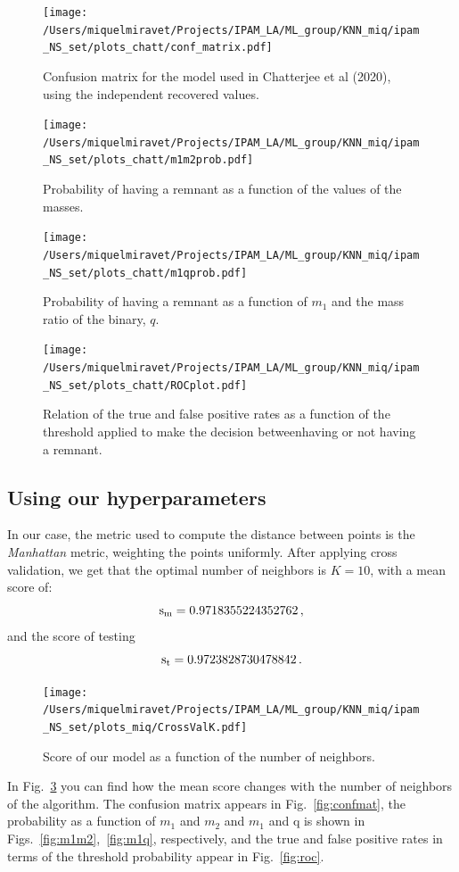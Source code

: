 \documentclass[prd,aps,twocolumn,a4paper,showkeys,nofootinbib]{revtex4-2}
\begin{document}
\begin{figure}[]
    \texttt{[image: /Users/miquelmiravet/Projects/IPAM\_LA/ML\_group/KNN\_miq/ipam\_NS\_set/plots\_chatt/conf\_matrix.pdf]}
    \caption{Confusion matrix for the model used in Chatterjee et al (2020), using the independent recovered values. }
    \label{fig:confmatChat}
    \texttt{[image: /Users/miquelmiravet/Projects/IPAM\_LA/ML\_group/KNN\_miq/ipam\_NS\_set/plots\_chatt/m1m2prob.pdf]}
    \caption{Probability of having a remnant as a function of the values of the masses.}
    \label{fig:m1m2Chat}
\end{figure}
\begin{figure}[]
    \texttt{[image: /Users/miquelmiravet/Projects/IPAM\_LA/ML\_group/KNN\_miq/ipam\_NS\_set/plots\_chatt/m1qprob.pdf]}
    \caption{Probability of having a remnant as a function of $m_1$ and the mass ratio of the binary, $q$.}
    \label{fig:m1qChat}
    \texttt{[image: /Users/miquelmiravet/Projects/IPAM\_LA/ML\_group/KNN\_miq/ipam\_NS\_set/plots\_chatt/ROCplot.pdf]}
    \caption{Relation of the true and false positive rates as a function of the threshold applied to make the decision betweenhaving or not having a remnant. }
    \label{fig:rocChat}
\end{figure}

\newpage

\subsection{Using our hyperparameters}
In our case, the metric used to compute the distance between points is the \textit{Manhattan} metric, weighting the points uniformly. After applying cross validation, we get that the  optimal number of neighbors is $K = 10$, with a mean score of: 
\begin{equation*}
	\rm{s_m} = 0.9718355224352762\,,
\end{equation*}
and the score of testing
\begin{equation*}
	\rm{s_t} = 0.9723828730478842\,.
\end{equation*}

\begin{figure}[]
    \texttt{[image: /Users/miquelmiravet/Projects/IPAM\_LA/ML\_group/KNN\_miq/ipam\_NS\_set/plots\_miq/CrossValK.pdf]}
    \caption{Score of our model as a function of the number of neighbors.}
    \label{fig:crossvalK}
    \end{figure}

In Fig.~\ref{fig:crossvalK} you can find how the mean score changes with the number of neighbors of the algorithm.  The confusion matrix appears in Fig.~\ref{fig:confmat}, the probability as a function of $m_1$ and $m_2$ and $m_1$ and q is shown in Figs.~\ref{fig:m1m2},~\ref{fig:m1q}, respectively, and the true and false positive rates in terms of the threshold probability appear in Fig.~\ref{fig:roc}.
\end{document}
